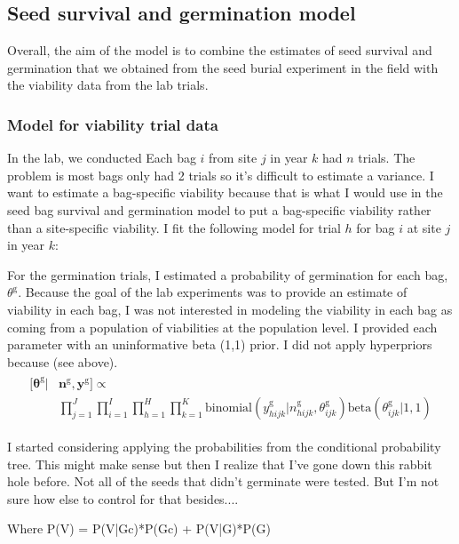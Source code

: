 \documentclass[12pt, oneside, titlepage]{article}   	%
\begin{document}
\subsection*{Seed survival and germination model}

Overall, the aim of the model is to combine the estimates of seed survival and germination that we obtained from the seed burial experiment in the field with the viability data from the lab trials. 

\subsubsection*{Model for viability trial data}

In the lab, we conducted Each bag $i$ from site $j$ in year $k$ had $n$ trials. The problem is most bags only had 2 trials so it's difficult to estimate a variance. I want to estimate a bag-specific viability because that is what I would use in the seed bag survival and germination model to put a bag-specific viability rather than a site-specific viability. I fit the following model for trial $h$ for bag $i$ at site $j$ in year $k$:

For the germination trials, I estimated a probability of germination for each bag, $\theta^\mathrm{g}$. Because the goal of the lab experiments was to provide an estimate of viability in each bag, I was not interested in modeling the viability in each bag as coming from a population of viabilities at the population level. I provided each parameter with an uninformative beta (1,1) prior. I did not apply hyperpriors because (see above).
%
\begin{align}
  \begin{split}
 [\bm{\theta^{\mathrm{g}}} | & \bm{n^{\mathrm{g}}}, \bm{y^{\mathrm{g}}} ] \propto
 \\  & \prod_{j=1}^{J} \prod_{i=1}^{I}  \prod_{h=1}^{H} \prod_{k=1}^{K}  \mathrm{binomial} ( y^{\mathrm{g}}_{hijk} | n^{\mathrm{g}}_{hijk}, \theta^{\mathrm{g}}_{ijk} )
\mathrm{beta} (  \theta^{\mathrm{g}}_{ijk} | 1 , 1 )
  \end{split}
\end{align}

I started considering applying the probabilities from the conditional probability tree. This might make sense but then I realize that I've gone down this rabbit hole before. Not all of the seeds that didn't germinate were tested. But I'm not sure how else to control for that besides....

Where P(V) = P(V|Gc)*P(Gc) + P(V|G)*P(G)
\end{document}
